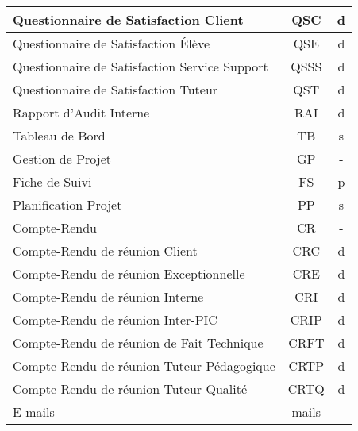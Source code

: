 \begin{longtable}{|p{12cm}|c|c|}
    \hline
    \hspace{2cm} Questionnaire de Satisfaction Client & QSC & d\\
    \hline
    \hspace{2cm} Questionnaire de Satisfaction Élève & QSE & d\\
    \hline
    \hspace{2cm} Questionnaire de Satisfaction Service Support & QSSS & d\\
    \hline
    \hspace{2cm} Questionnaire de Satisfaction Tuteur & QST & d\\    
    \hline
    \hspace{1cm} Rapport d'Audit Interne & RAI & d\\
    \hline
    \hspace{1cm} Tableau de Bord & TB & s\\
    \hline
    Gestion de Projet & GP & -\\
    \hline
    \hspace{1cm} Fiche de Suivi & FS & p\\
    \hline
    \hspace{1cm} Planification Projet & PP & s\\    
    \hline
    \hspace{1cm} Compte-Rendu & CR & -\\
    \hline
    \hspace{2cm} Compte-Rendu de réunion Client & CRC & d\\
    \hline
    \hspace{2cm} Compte-Rendu de réunion Exceptionnelle & CRE & d\\
    \hline
    \hspace{2cm} Compte-Rendu de réunion Interne & CRI & d\\
    \hline
    \hspace{2cm} Compte-Rendu de réunion Inter-PIC & CRIP & d\\
    \hline
    \hspace{2cm} Compte-Rendu de réunion de Fait Technique & CRFT & d\\
    \hline
    \hspace{2cm} Compte-Rendu de réunion Tuteur Pédagogique & CRTP & d\\
    \hline
    \hspace{2cm} Compte-Rendu de réunion Tuteur Qualité & CRTQ & d\\
    \hline
    \hspace{1cm} E-mails & mails & -\\

\end{longtable}
